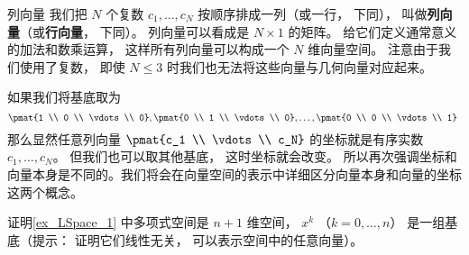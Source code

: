 
\begin{exercise}{列向量}
我们把 $N$ 个复数 $c_1, \dots, c_N$ 按顺序排成一列（或一行， 下同）， 叫做\textbf{列向量}（或\textbf{行向量}， 下同）。 列向量可以看成是 $N \times 1$ 的矩阵。 给它们定义通常意义的加法和数乘运算， 这样所有列向量可以构成一个 $N$ 维向量空间。 注意由于我们使用了复数， 即使 $N \leqslant 3$ 时我们也无法将这些向量与几何向量对应起来。

如果我们将基底取为
$$
\pmat{1 \\ 0 \\ \vdots \\ 0}, \pmat{0 \\ 1 \\ \vdots \\ 0}, \dots, \pmat{0 \\ 0 \\ \vdots \\ 1}~
$$
那么显然任意列向量 $\pmat{c_1 \\ \vdots \\ c_N}$ 的坐标就是有序实数 $c_1, \dots, c_N$。 但我们也可以取其他基底， 这时坐标就会改变。 所以再次强调坐标和向量本身是不同的。我们将会在向量空间的表示中详细区分向量本身和向量的坐标这两个概念。
\end{exercise}

\begin{exercise}{}
证明\autoref{ex_LSpace_1} 中多项式空间是 $n+1$ 维空间， $x^k$ （$k = 0, \dots, n$） 是一组基底（提示： 证明它们线性无关， 可以表示空间中的任意向量）。
\end{exercise}




